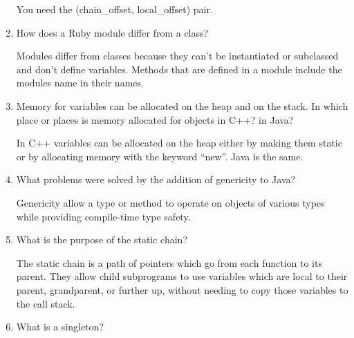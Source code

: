 \begin{enumerate}
 \begin{answer}

    You need the (chain_offset, local_offset) pair.

    \end{answer}

  \item How does a Ruby module differ from a class?

 \begin{answer}

    Modules differ from classes because they can't be instantiated or subclassed
and don't define variables.  Methods that are defined in a module include the
modules name in their names.

    \end{answer}

  \item Memory for variables can be allocated on the heap
    and on the stack. In which place or places is memory
    allocated for objects in C++? in Java?

 \begin{answer}

    In C++ variables can be allocated on the heap either by making them static
or by allocating memory with the keyword ``new''.  Java is the same.

    \end{answer}

  \item What problems were solved by the addition
    of genericity to Java?

 \begin{answer}

    Genericity allow a type or method to operate on objects of various types
while providing compile-time type safety.

    \end{answer}

  \item What is the purpose of the static chain?

 \begin{answer}

    The static chain is a path of pointers which go from each function to its
parent. They allow child subprograms to use variables which are local to their
parent, grandparent, or further up, without needing to copy those variables to the
call stack.

    \end{answer}

  \item What is a singleton?


\end{enumerate}
